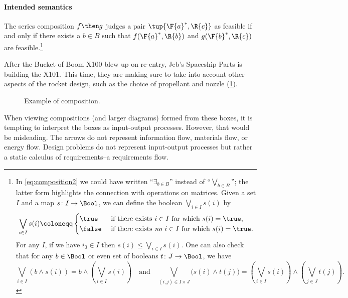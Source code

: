\paragraph{Intended semantics}
The series composition $f\then g$ judges a pair $\tup{\F{a}^*,\R{c}}$ as feasible if and only if there exists a $b \in B$ such that $f(\F{a}^*,\R{b})$ and $g(\F{b}^*,\R{c})$ are feasible.\footnote{In \eqref{eq:composition2} we could have written ``$\exists_{b\in B}$''
instead of ``$\bigvee_{b\in B}$''; the latter form highlights the connection
with operations on matrices. Given a set $I$ and a map $s\colon I\to\Bool$, we can define the boolean $\bigvee_{i\in I}s(i)$ by
\begin{equation*}
 \bigvee_{i\in I}s(i)\coloneqq
 \begin{cases}
 	\true&\text{ if there exists }i\in I\text{ for which }s(i)=\true,\\
 	\false&\text{ if there exists \emph{no} }i\in I\text{ for which }s(i)=\true.
 \end{cases}
 \end{equation*}
 For any $I$, if we have $i_0\in I$ then $s(i)\leq\bigvee_{i\in I}s(i)$. One can also check that for any $b\in\Bool$ or even set of booleans $t\colon J\to\Bool$, we have
 \begin{equation*}
     \bigvee_{i\in I}(b\wedge s(i))=b\wedge\left(\bigvee_{i\in I}s(i)\right)
 \quad\text{and}\quad
 \bigvee_{(i,j)\in I\times  J}\big(s(i)\wedge t(j)\big)=\left(\bigvee_{i\in I}s(i)\right)\wedge\left(\bigvee_{j\in J} t(j)\right).
 \end{equation*}
}

\begin{example}
After the Bucket of Boom X100 blew up on re-entry, Jeb's Spaceship Parts is building the X101. This time, they are making sure to take into account other aspects of the rocket design, such as the choice of propellant and nozzle (\cref{fig:examplecomposition}).
\begin{figure}[h!]
\begin{center}
\end{center}
\caption{Example of composition. \label{fig:examplecomposition}}
\end{figure}
\end{example}

\begin{remark}
When viewing compositions (and larger diagrams) formed from these boxes, it is tempting to interpret the boxes as input-output processes. However, that would be misleading. The arrows do not represent information flow, materials flow, or energy flow. Design problems do not represent input-output processes but rather a static calculus of requirements--a requirements flow.
\end{remark}

